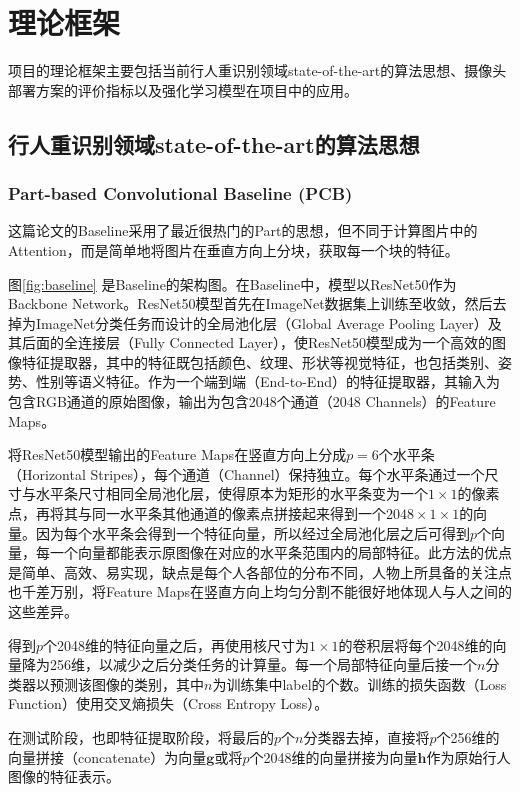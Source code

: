 \chapter{理论框架}\label{sec:theory}

项目的理论框架主要包括当前行人重识别领域state-of-the-art的算法思想、摄像头部署方案的评价指标以及强化学习模型在项目中的应用。

\section{行人重识别领域state-of-the-art的算法思想}

\subsection{Part-based Convolutional Baseline (PCB)}
这篇论文的Baseline采用了最近很热门的Part的思想，但不同于计算图片中的Attention，而是简单地将图片在垂直方向上分块，获取每一个块的特征。

图\ref{fig:baseline} 是Baseline的架构图。在Baseline中，模型以ResNet50作为Backbone Network。ResNet50模型首先在ImageNet数据集上训练至收敛，然后去掉为ImageNet分类任务而设计的全局池化层（Global Average Pooling Layer）及其后面的全连接层（Fully Connected Layer），使ResNet50模型成为一个高效的图像特征提取器，其中的特征既包括颜色、纹理、形状等视觉特征，也包括类别、姿势、性别等语义特征。作为一个端到端（End-to-End）的特征提取器，其输入为包含RGB通道的原始图像，输出为包含2048个通道（2048 Channels）的Feature Maps。

将ResNet50模型输出的Feature Maps在竖直方向上分成$p=6$个水平条（Horizontal Stripes），每个通道（Channel）保持独立。每个水平条通过一个尺寸与水平条尺寸相同全局池化层，使得原本为矩形的水平条变为一个$1\times1$的像素点，再将其与同一水平条其他通道的像素点拼接起来得到一个$2048\times1\times1$的向量。因为每个水平条会得到一个特征向量，所以经过全局池化层之后可得到$p$个向量，每一个向量都能表示原图像在对应的水平条范围内的局部特征。此方法的优点是简单、高效、易实现，缺点是每个人各部位的分布不同，人物上所具备的关注点也千差万别，将Feature Maps在竖直方向上均匀分割不能很好地体现人与人之间的这些差异。

得到$p$个2048维的特征向量之后，再使用核尺寸为$1\times1$的卷积层将每个2048维的向量降为256维，以减少之后分类任务的计算量。每一个局部特征向量后接一个$n$分类器以预测该图像的类别，其中$n$为训练集中label的个数。训练的损失函数（Loss Function）使用交叉熵损失（Cross Entropy Loss）。

在测试阶段，也即特征提取阶段，将最后的$p$个$n$分类器去掉，直接将$p$个256维的向量拼接（concatenate）为向量$\boldsymbol{g}$或将$p$个2048维的向量拼接为向量$\boldsymbol{h}$作为原始行人图像的特征表示。

